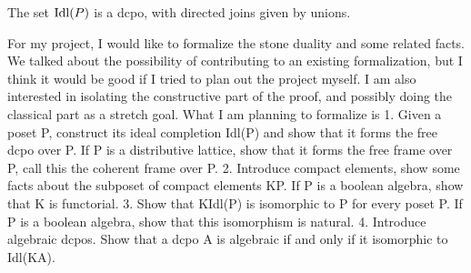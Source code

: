 \begin{proposition}
  The set \(\operatorname{Idl}(P)\) is a dcpo, with directed joins given by unions.
\end{proposition}

For my project, I would like to formalize the stone duality and some related facts. We talked about the possibility of contributing to an existing formalization, but I think it would be good if I tried to plan out the project myself. I am also interested in isolating the constructive part of the proof, and possibly doing the classical part as a stretch goal. What I am planning to formalize is
1. Given a poset P, construct its ideal completion Idl(P) and show that it forms the free dcpo over P. If P is a distributive lattice, show that it forms the free frame over P, call this the coherent frame over P.
2. Introduce compact elements, show some facts about the subposet of compact elements KP. If P is a boolean algebra, show that K is functorial.
3. Show that KIdl(P) is isomorphic to P for every poset P. If P is a boolean algebra, show that this isomorphism is natural.
4. Introduce algebraic dcpos. Show that a dcpo A is algebraic if and only if it isomorphic to Idl(KA).
